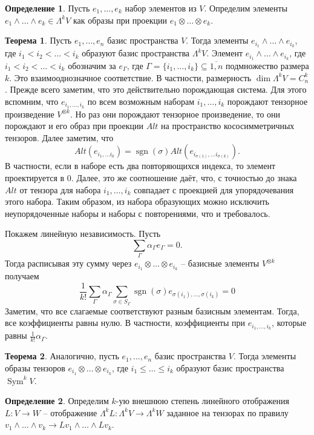 \documentclass[12pt,a4paper,oneside]{book}
\theoremstyle{definition}
\newtheorem*{defn}{\color{yellow!30!red} Определение}
\newtheorem{thm}{\color{red!40!black}Теорема}
\renewcommand{\leq}{\leqslant}
\newcommand{\ovl}{\overline}
\newcommand{\Sym}{\operatorname{Sym}}
\newcommand{\sgn}{\operatorname{sgn}}
\def\thrm{\begin{thm}}
\def\ethrm{\end{thm}}
\def\dfn{\begin{defn}}
\def\edfn{\end{defn}}
\begin{document}
\dfn Пусть $e_1,\dots, e_k$ набор элементов из $V$. Определим элементы $e_1\wedge \dots \wedge e_k \in \Lambda^k V$ как образы при проекции $e_1\otimes \dots \otimes e_k$.
\edfn

\thrm Пусть $e_1,\dots, e_n$ базис пространства $V$. Тогда элементы $e_{i_1}\wedge \dots \wedge e_{i_k}$, где $i_1<i_2< \dots < i_k$ образуют базис пространства $\Lambda^k V$. Элемент $e_{i_1}\wedge \dots \wedge e_{i_k}$, где $i_1<i_2< \dots < i_k$  обозначим за $e_{\Gamma}$, где $\Gamma =\{i_1,\dots,i_k\}\subseteq \ovl{1,n}$ подмножество размера $k$. Это взаимооднозначное соответствие. В частности, размерность $\dim \Lambda^k V = C^k_n$. 
\proof Прежде всего заметим, что это действительно порождающая система. Для этого вспомним, что $e_{i_1,\dots,i_k}$ по всем возможным наборам $i_1,\dots,i_k$ порождают тензорное произведение $V^{\otimes k}$. Но раз они порождают тензорное произведение, то они порождают и его образ при проекции $Alt$ на пространство кососимметричных тензоров. Далее заметим, что $$Alt(e_{i_1,\dots i_k})= \sgn(\sigma) Alt(e_{i_{\sigma(1)},\dots i_{\sigma(k)}}).$$
В частности, если в наборе есть два повторяющихся индекса, то элемент проектируется в 0. Далее, это же соотношение даёт, что,  с точностью до знака $Alt$ от тензора для набора $i_1,\dots,i_k$ совпадает с проекцией для упорядочевания этого набора. Таким образом, из набора образующих можно исключить неупорядоченные наборы и наборы с повторениями, что и требовалось.

\noindent Покажем линейную независимость. Пусть  
$$\sum_{\Gamma} \alpha_{\Gamma} e_{\Gamma}=0.$$
Тогда расписывая эту сумму через $e_{i_1}\otimes \dots \otimes e_{i_k}$ -- базисные элементы $V^{\otimes k}$ получаем
$$\frac{1}{k!}\sum_{\Gamma} \alpha_{\Gamma} \sum_{\sigma \in S_{\Gamma}} \sgn(\sigma) e_{\sigma(i_1),\dots,\sigma(i_k)} =0 $$
Заметим, что все слагаемые соответствуют разным базисным элементам. Тогда, все коэффициенты равны нулю. В частности, коэффициенты при $ e_{i_1, \dots, i_k}$, которые равны $\frac{1}{k!}\alpha_{\Gamma}$. 

\endproof
\ethrm

\thrm Аналогично, пусть $e_1,\dots, e_n$ базис пространства $V$. Тогда элементы образы тензоров $e_{i_1}\otimes \dots \otimes e_{i_k}$, где $i_1\leq \dots \leq i_k$ образуют базис пространства $\Sym^k V$.
\ethrm

\dfn Определим $k$-ую внешнюю степень линейного отображения $L\colon V \to W$ -- отображение $\Lambda^{k} L  \colon \Lambda^k V \to \Lambda^k W$ заданное на тензорах по правилу $v_1\wedge \dots \wedge v_k \to L v_1 \wedge \dots \wedge L v_k$. 
\edfn
\end{document}
